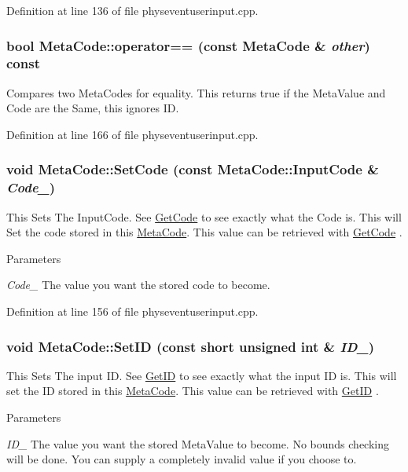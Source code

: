 Definition at line 136 of file physeventuserinput.cpp.\hypertarget{classMetaCode_a296b774682a9326494e0c2d1b357ec2a}{
\subsubsection[{operator==}]{\setlength{\rightskip}{0pt plus 5cm}bool MetaCode::operator== (const {\bf MetaCode} \& {\em other}) const}}
\label{d7/d72/classMetaCode_a296b774682a9326494e0c2d1b357ec2a}


Compares two MetaCodes for equality. This returns true if the MetaValue and Code are the Same, this ignores ID. 

Definition at line 166 of file physeventuserinput.cpp.\hypertarget{classMetaCode_a9be5fcad22449c12b649801ab97bbf20}{
\subsubsection[{SetCode}]{\setlength{\rightskip}{0pt plus 5cm}void MetaCode::SetCode (const {\bf MetaCode::InputCode} \& {\em Code\_\-})}}
\label{d7/d72/classMetaCode_a9be5fcad22449c12b649801ab97bbf20}


This Sets The InputCode. See \hyperlink{classMetaCode_a94532fc103d95f3de53eeccbadd6f17b}{GetCode} to see exactly what the Code is. This will Set the code stored in this \hyperlink{classMetaCode}{MetaCode}. This value can be retrieved with \hyperlink{classMetaCode_a94532fc103d95f3de53eeccbadd6f17b}{GetCode} . 
\begin{DoxyParams}{Parameters}
\item[{\em Code\_\-}]The value you want the stored code to become. \end{DoxyParams}


Definition at line 156 of file physeventuserinput.cpp.\hypertarget{classMetaCode_a0eb10030320a1fcfdda3b867b90e629f}{
\subsubsection[{SetID}]{\setlength{\rightskip}{0pt plus 5cm}void MetaCode::SetID (const short unsigned int \& {\em ID\_\-})}}
\label{d7/d72/classMetaCode_a0eb10030320a1fcfdda3b867b90e629f}


This Sets The input ID. See \hyperlink{classMetaCode_a680b5e1c2ce8d8d08d00f10187728547}{GetID} to see exactly what the input ID is. This will set the ID stored in this \hyperlink{classMetaCode}{MetaCode}. This value can be retrieved with \hyperlink{classMetaCode_a680b5e1c2ce8d8d08d00f10187728547}{GetID} . 
\begin{DoxyParams}{Parameters}
\item[{\em ID\_\-}]The value you want the stored MetaValue to become. No bounds checking will be done. You can supply a completely invalid value if you choose to. \end{DoxyParams}


